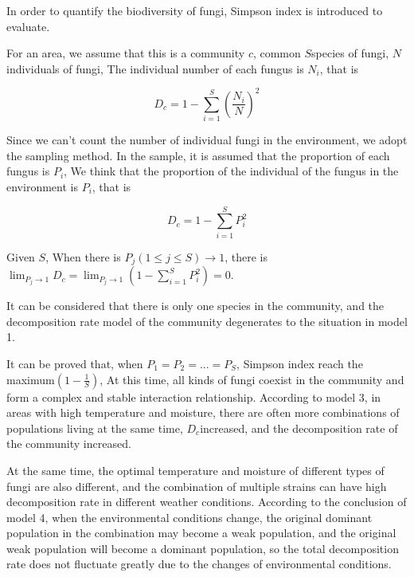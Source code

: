 \documentclass{mcmthesis}
\begin{document}
In order to quantify the biodiversity of fungi, Simpson index is introduced to evaluate.

For an area, we assume that this is a community $ c $, common $ S $species of fungi, $ N $individuals of fungi, The individual number of each fungus is $ N_i $, that is

\begin{equation}
  D_c=1-\sum_{i=1}^{S}\left(\frac{N_i}{N}\right)^{2}
\end{equation}

Since we can't count the number of individual fungi in the environment, we adopt the sampling method. In the sample, it is assumed that the proportion of each fungus is $ P_i $, We think that the proportion of the individual of the fungus in the environment is $ P_i $, that is

\begin{equation}
  D_c=1-\sum_{i=1}^{S}P_i^{2}
\end{equation}

Given $ S $, When there is $ P_j(1\leq{j} \leq{S})\rightarrow{1} $, there is $\lim_{P_j \rightarrow 1}{D_c}=\lim_{P_j \rightarrow 1}{\left(1-\sum_{i=1}^{S}P_i^{2}\right)}=0$.

It can be considered that there is only one species in the community, and the decomposition rate model of the community degenerates to the situation in model 1.

It can be proved that, when $ P_1=P_2=...=P_S $, Simpson index reach the maximum$ \left(1-\frac{1}{S}\right) $, At this time, all kinds of fungi coexist in the community and form a complex and stable interaction relationship. According to model 3, in areas with high temperature and moisture, there are often more combinations of populations living at the same time, $ D_c $increased, and the decomposition rate of the community increased.

At the same time, the optimal temperature and moisture of different types of fungi are also different, and the combination of multiple strains can have high decomposition rate in different weather conditions. According to the conclusion of model 4, when the environmental conditions change, the original dominant population in the combination may become a weak population, and the original weak population will become a dominant population, so the total decomposition rate does not fluctuate greatly due to the changes of environmental conditions.
\end{document}
